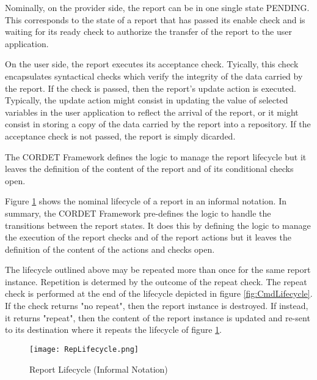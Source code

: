 Nominally, on the provider side, the report can be in one single state PENDING. This corresponds to the state of a report that has passed its enable check and is waiting for its ready check to authorize the transfer of the report to the user application. 

On the user side, the report executes its acceptance check. Tyically, this check encapsulates syntactical checks which verify the integrity of the data carried by the report. If the check is passed, then the report's update action is executed. Typically, the update action might consist in updating the value of selected variables in the user application to reflect the arrival of the report, or it might consist in storing a copy of the data carried by the report into a repository. If the acceptance check is not passed, the report is simply dicarded.  

The CORDET Framework defines the logic to manage the report lifecycle but it leaves the definition of the content of the report and of its conditional checks open.

Figure \ref{fig:RepLifecycle} shows the nominal lifecycle of a report in an informal notation. In summary, the CORDET Framework pre-defines the logic to handle the transitions between the report states. It does this by defining the logic to manage the execution of the report checks and of the report actions but it leaves the definition of the content of the actions and checks open. 

The lifecycle outlined above may be repeated more than once for the same report instance. Repetition is determed by the outcome of the repeat check. The repeat check is performed at the end of the lifecycle depicted in figure \ref{fig:CmdLifecycle}. If the check returns "no repeat", then the report instance is destroyed. If instead, it returns "repeat", then the content of the report instance is updated and re-sent to its destination where it repeats the lifecycle of figure \ref{fig:RepLifecycle}.

\begin{figure}[H]
 \centering
 \texttt{[image: RepLifecycle.png]}
 \caption{Report Lifecycle (Informal Notation)}
 \label{fig:RepLifecycle}
\end{figure}


